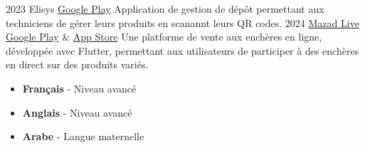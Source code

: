 \documentclass[9pt]{developercv} %
\begin{document}
\vspace{-20 pt}
\begin{entrylist}
    \entry
    {2023}
    {Elisys}
    {
        \href{https://play.google.com/store/apps/details?id=fr.elisys.mobile&hl=en}{Google Play}
    }
    {
        Application de gestion de dépôt permettant aux techniciens de gérer leurs produits en scanannt leurs QR codes.
    }
    \entry
    {2024}
    {\href{https://mazadlive.net/en}{Mazad Live}}
    {
        \href{https://play.google.com/store/apps/details?id=mazad.live.app&hl=en}{Google Play} \& \href{https://apps.apple.com/tn/app/mzad-live/id6463001872}{App Store}
    }
    {
        Une platforme de vente aux enchères en ligne, développée avec Flutter, permettant aux utilisateurs de participer à des enchères en direct sur des produits variés.
    }
\end{entrylist}




\vspace{-20 pt}
\vspace{-6pt}


\begin{itemize}[noitemsep,topsep=0pt,parsep=0pt,partopsep=0pt, leftmargin=0.18\textwidth]
    \item \textbf{Français} - Niveau avancé
    \item \textbf{Anglais} - Niveau avancé
    \item \textbf{Arabe} - Langue maternelle
\end{itemize}




\end{document}
